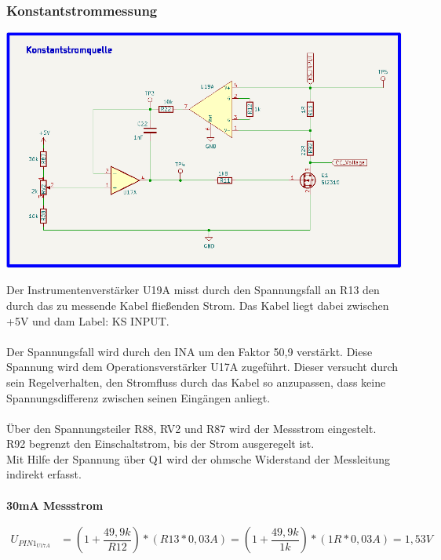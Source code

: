 \subsubsection{Konstantstrommessung}
\begin{center}
\includegraphics[width=16cm]{Bilder/Konstantstromquelle.png}
\end{center}

Der Instrumentenverstärker U19A misst durch den Spannungsfall an R13 den durch das zu messende Kabel fließenden Strom. Das Kabel liegt dabei zwischen +5V und dam Label: KS INPUT.
\\
\\
Der Spannungsfall wird durch den INA um den Faktor 50,9 verstärkt. Diese Spannung wird dem Operationsverstärker U17A zugeführt. Dieser versucht durch sein Regelverhalten, den Stromfluss durch das Kabel so anzupassen, dass keine Spannungsdifferenz zwischen seinen Eingängen anliegt.
\\
\\
Über den Spannungsteiler R88, RV2 und R87 wird der Messstrom eingestelt. 
\\
R92 begrenzt den Einschaltstrom, bis der Strom ausgeregelt ist. 
\\
Mit Hilfe der Spannung über Q1 wird der ohmsche Widerstand der Messleitung indirekt erfasst.
\\
\\
\textbf{30mA Messstrom}
\\
\begin{center}
\begin{align}
	U_{PIN1_{U17A}} &= (1 + \dfrac{49,9k}{R12}) * (R13 * 0,03A) = (1 + \dfrac{49,9k}{1k}) * (1R * 0,03A) = 1,53V
\end{align} 
\end{center}


